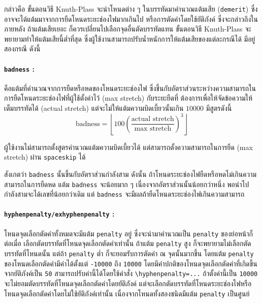 กล่าวคือ ขั้นตอนวิธี Knuth-Plass จะนำโหนดต่าง ๆ ในบรรทัดมาคำนวณแต้มเสีย
(\texttt{demerit}) ซึ่งอาจจะได้แต้มมาจากการยืดโหนดระยะช่องไฟมากเกินไป
หรือการตัดคำโดยใช้ยัติภังค์ ซึ่งจะกล่าวถึงในภายหลัง ถ้าแต้มเสียเยอะ
ก็ควรเปลี่ยนไปเลือกจุดอื่นตัดบรรทัดแทน ขั้นตอนวิธี Knuth-Plass
จะพยายามทำให้แต้มเสียนี้ต่ำที่สุด
ซึ่งผู้ใช้งานสามารถปรับน้ำหนักการให้แต้มเสียของแต่ละกรณีได้ มีอยู่สองกรณี ดังนี้

\paragraph{\texttt{badness} :}

คือแต้มที่คำนวณจากการยืดหรือหดของโหนดระยะช่องไฟ
ซึ่งขึ้นกับอัตราส่วนระหว่างความสามารถในการยืดโหนดระยะช่องไฟที่ผู้ใช้ตั้งค่าไว้
(max stretch) กับระยะยืดที่ \texlogo ต้องการเพื่อให้จัดข้อความให้เต็มบรรทัดได้
(actual stretch) แต่จะไม่ให้แต้มความบิดเบี้ยวนั้นเกิน \(10000\) มีสูตรดังนี้
\begin{equation}
  \textrm{badness} = \left\lfloor 100\left( \frac{\textrm{actual stretch}}{\textrm{max stretch}} \right)^3 \right\rfloor
\end{equation}

ผู้ใช้งานไม่สามารถตั้งสูตรคำนวณแต้มความบิดเบี้ยวได้
แต่สามารถตั้งความสามารถในการยืด (max stretch) ผ่าน \texttt{spaceskip} ได้

สังเกตว่า \texttt{badness} นั้นขึ้นกับอัตราส่วนกำลังสาม ดังนั้น
ถ้าโหนดระยะช่องไฟยืดหรือหดไม่เกินความสามารถในการยืดหด แต้ม \texttt{badness}
จะน้อยมาก ๆ เนื่องจากอัตราส่วนนั้นน้อยกว่าหนึ่ง
พอนำไปกำลังสามจะได้เลขที่น้อยกว่าเดิม แต่ \texttt{badness}
จะมีผลถ้ายืดโหนดระยะช่องไฟเกินความสามารถ

\paragraph{\texttt{hyphenpenalty/exhyphenpenalty} :}

โหนดจุดเลือกตัดคำทั้งหมดจะมีแต้ม \texttt{penalty} อยู่ ซึ่งจะนำมาคำนวณเป็น
\texttt{penalty} ของย่อหน้าก็ต่อเมื่อ \texlogo
เลือกตัดบรรทัดที่โหนดจุดเลือกตัดคำเท่านั้น ถ้าแต้ม \texttt{penalty} สูง \texlogo
ก็จะพยายามไม่เลือกตัดบรรทัดที่โหนดนั้น แต่ถ้า \texttt{penalty} ต่ำ \texlogo
ก็จะยอมรับการตัดคำ ณ จุดนั้นมากขึ้น โดยแต้ม \texttt{penalty}
ของโหนดเลือกตัดคำมีค่าได้ตั้งแต่ \texttt{-10000} ถึง \texttt{10000}
โดยมีค่าปกติของโหนดจุดเลือกตัดคำที่เกิดขึ้นจากยัติภังค์เป็น \texttt{50}
สามารถปรับค่านี้ได้โดยใช้คำสั่ง \texttt{\textbackslash hyphenpenalty=...}
ถ้าตั้งค่านี้เป็น \texttt{10000} \texlogo
จะไม่ยอมตัดบรรทัดที่โหนดจุดเลือกตัดคำโดยยัติภังค์
แต่จะเลือกตัดบรรทัดที่โหนดระยะช่องไฟหรือโหนดจุดเลือกตัดคำโดยไม่ใช้ยัติภังค์เท่านั้น
เนื่องจากโหนดทั้งสองชนิดมีแต้ม \texttt{penalty} เป็นศูนย์

